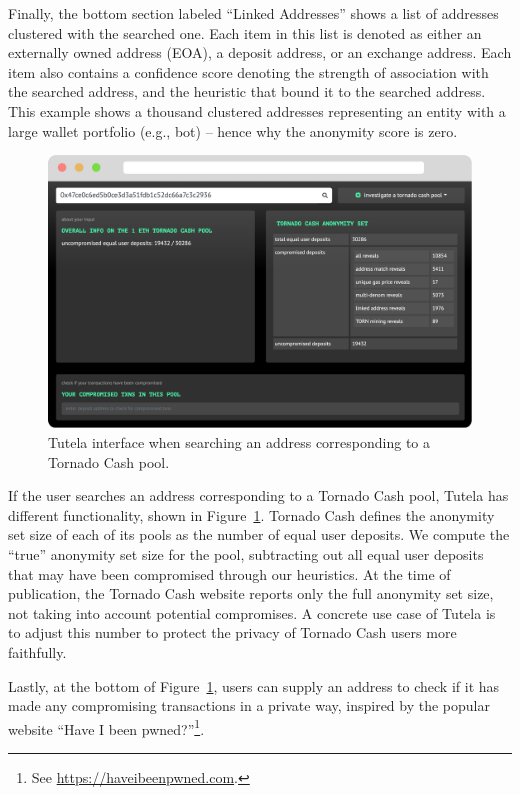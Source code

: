 Finally, the bottom section labeled ``Linked Addresses'' shows a list of addresses clustered with the searched one. Each item in this list is denoted as either an externally owned address (EOA), a deposit address, or an exchange address. Each item also contains a confidence score denoting the strength of association with the searched address, and the heuristic that bound it to the searched address.
This example shows a thousand clustered addresses representing an entity with a large wallet portfolio (e.g., bot) -- hence why the anonymity score is zero.

\begin{figure}[h!]
\includegraphics[width=\linewidth]{figures/demo2.pdf}
\caption{Tutela interface when searching an address corresponding to a Tornado Cash pool.}
\label{fig:demo2}
\end{figure}

If the user searches an address corresponding to a Tornado Cash pool, Tutela has different functionality, shown in Figure~\ref{fig:demo2}. Tornado Cash defines the anonymity set size of each of its pools as the number of equal user deposits. We compute the ``true'' anonymity set size for the pool, subtracting out all equal user deposits that may have been compromised through our heuristics. At the time of publication, the Tornado Cash website reports only the full anonymity set size, not taking into account potential compromises. A concrete use case of Tutela is to adjust this number to protect the privacy of Tornado Cash users more faithfully. 

Lastly, at the bottom of Figure~\ref{fig:demo2}, users can supply an address to check if it has made any compromising transactions in a private way, inspired by the popular website ``Have I been pwned?''\footnote{See \url{https://haveibeenpwned.com}.}.